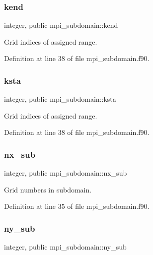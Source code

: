 \subsubsection{\texorpdfstring{kend}{kend}}
{\footnotesize\ttfamily integer, public mpi\+\_\+subdomain\+::kend}



Grid indices of assigned range. 



Definition at line 38 of file mpi\+\_\+subdomain.\+f90.

\mbox{\label{namespacempi__subdomain_acd499eb1d07159aa9f5c878f9519b00f}} 
\subsubsection{\texorpdfstring{ksta}{ksta}}
{\footnotesize\ttfamily integer, public mpi\+\_\+subdomain\+::ksta}



Grid indices of assigned range. 



Definition at line 38 of file mpi\+\_\+subdomain.\+f90.

\mbox{\label{namespacempi__subdomain_a005fe127fe0fc85b932814a820a36444}} 
\subsubsection{\texorpdfstring{nx\_sub}{nx\_sub}}
{\footnotesize\ttfamily integer, public mpi\+\_\+subdomain\+::nx\+\_\+sub}



Grid numbers in subdomain. 



Definition at line 35 of file mpi\+\_\+subdomain.\+f90.

\mbox{\label{namespacempi__subdomain_a665ba05d0ae9309dd28b9b513a0c87a1}} 
\subsubsection{\texorpdfstring{ny\_sub}{ny\_sub}}
{\footnotesize\ttfamily integer, public mpi\+\_\+subdomain\+::ny\+\_\+sub}



